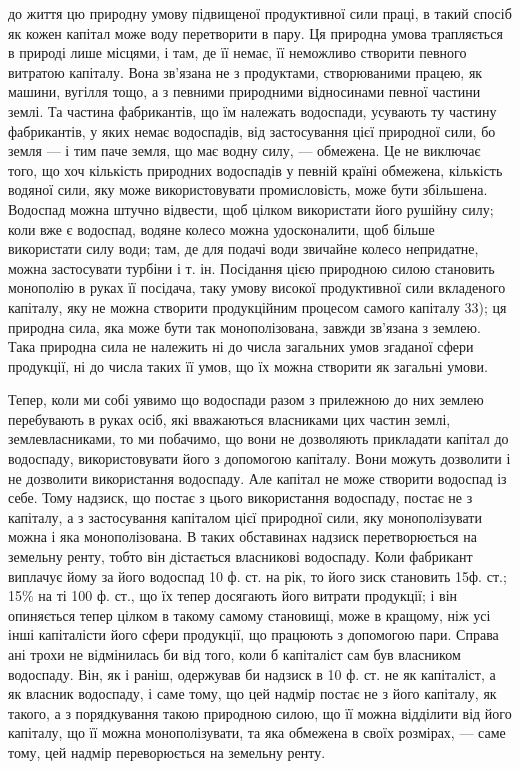 до життя цю природну умову підвищеної продуктивної сили праці, в такий
спосіб як кожен капітал може воду перетворити в пару. Ця природна умова
трапляється в природі лише місцями, і там, де її немає, її неможливо створити
певного витратою капіталу. Вона зв’язана не з продуктами, створюваними працею,
як машини, вугілля тощо, а з певними природними відносинами певної частини
землі. Та частина фабрикантів, що їм належать водоспади, усувають ту частину
фабрикантів, у яких немає водоспадів, від застосування цієї природної сили,
бо земля — і тим паче земля, що має водну силу, — обмежена. Це не виключає
того, що хоч кількість природних водоспадів у певній країні обмежена, кількість
водяної сили, яку може використовувати промисловість, може бути збільшена.
Водоспад можна штучно відвести, щоб цілком використати його рушійну силу;
коли вже є водоспад, водяне колесо можна удосконалити, щоб більше використати
силу води; там, де для подачі води звичайне колесо непридатне, можна застосувати
турбіни і т. ін. Посідання цією природною силою становить монополію
в руках її посідача, таку умову високої продуктивної сили вкладеного капіталу,
яку не можна створити продукційним процесом самого капіталу 33); ця природна
сила, яка може бути так монополізована, завжди зв’язана з землею. Така природна
сила не належить ні до числа загальних умов згаданої сфери продукції, ні до
числа таких її умов, що їх можна створити як загальні умови.

Тепер, коли ми собі уявимо що водоспади разом з прилежною до них землею
перебувають в руках осіб, які вважаються власниками цих частин землі,
землевласниками, то ми побачимо, що вони не дозволяють прикладати капітал
до водоспаду, використовувати його з допомогою капіталу. Вони можуть
дозволити і не дозволити використання водоспаду. Але капітал не може створити
водоспад із себе. Тому надзиск, що постає з цього використання водоспаду, постає
не з капіталу, а з застосування капіталом цієї природної сили, яку монополізувати
можна і яка монополізована. В таких обставинах надзиск перетворюється на земельну
ренту, тобто він дістається власникові водоспаду. Коли фабрикант виплачує
йому за його водоспад 10 ф. ст. на рік, то його зиск становить 15ф. ст.; 15\% на
ті 100 ф. ст., що їх тепер досягають його витрати продукції; і він опиняється
тепер цілком в такому самому становищі, може в кращому, ніж усі інші капіталісти
його сфери продукції, що працюють з допомогою пари. Справа ані трохи
не відмінилась би від того, коли б капіталіст сам був власником водоспаду. Він,
як і раніш, одержував би надзиск в 10 ф. ст. не як капіталіст, а як власник водоспаду,
і саме тому, що цей надмір постає не з його капіталу, як такого, а
з порядкування такою природною силою, що її можна відділити від його капіталу,
що її можна монополізувати, та яка обмежена в своїх розмірах, — саме тому, цей
надмір переворюється на земельну ренту.

